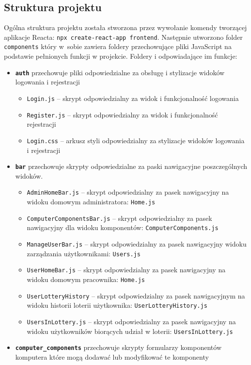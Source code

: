 \subsection{Struktura projektu}
Ogólna struktura projektu została stworzona przez wywołanie komendy tworzącej aplikacje Reacta: \texttt{npx create-react-app frontend}. Następnie utworzono folder \texttt{components} który w~sobie zawiera foldery przechowujące pliki JavaScript na podstawie pełnionych funkcji w projekcie. Foldery i odpowiadające im funkcje: 
\begin {itemize}
\item \texttt{\textbf{auth}} przechowuje pliki odpowiedzialne za obsługę i stylizacje widoków logowania i rejestracji
	\begin{itemize}
	\item \texttt{Login.js} -- skrypt odpowiedzialny za widok i funkcjonalność logowania
	\item \texttt{Register.js} -- skrypt odpowiedzialny za widok i funkcjonalność rejestracji
	\item \texttt{Login.css} -- arkusz styli odpowiedzialny za stylizacje widoków logowania i rejestracji
	\end{itemize}
\item \texttt{\textbf{bar}} przechowuje skrypty odpowiedzialne za paski nawigacyjne poszczególnych widoków.
	\begin{itemize}
	\item \texttt{AdminHomeBar.js} -- skrypt odpowiedzialny za pasek nawigacyjny na widoku domowym administratora: \texttt{Home.js}
	\item \texttt{ComputerComponentsBar.js} -- skrypt odpowiedzialny za pasek nawigacyjny dla widoku komponentów: \texttt{ComputerComponents.js}
	\item \texttt{ManageUserBar.js} -- skrypt odpowiedzialny za pasek nawigacyjny widoku zarządzania użytkownikami: \texttt{Users.js}
	\item \texttt{UserHomeBar.js} -- skrypt odpowiedzialny za pasek nawigacyjny na widoku domowym pracownika: \texttt{Home.js}
	\item \texttt{UserLotteryHistory} -- skrypt odpowiedzialny za pasek nawigacyjnym na widoku historii loterii użytkownika: \texttt{UserLotteryHistory.js}
	\item \texttt{UsersInLottery.js} -- skrypt odpowiedzialny za pasek nawigacyjny na widoku użytkowników biorących udział w loterii: \texttt{UsersInLottery.js}
	\end{itemize}
\item \texttt{\textbf{computer\_components}} przechowuje skrypty formularzy komponentów komputera które mogą dodawać lub modyfikować te komponenty

\end{itemize}
